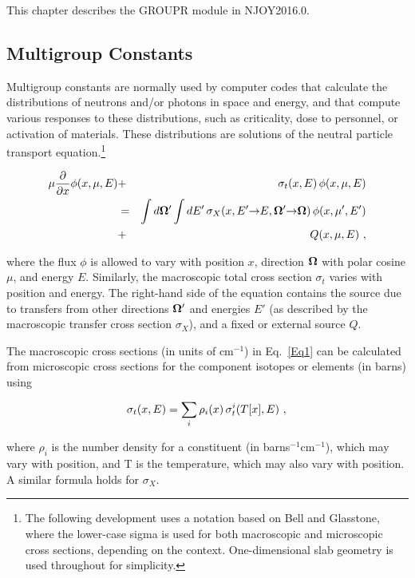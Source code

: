 This chapter describes the GROUPR module in NJOY2016.0.

\subsection{Multigroup Constants}
\label{ssGROUPR_MG}

Multigroup constants are normally used by computer codes that calculate
the distributions of neutrons and/or photons in space and energy, and that
compute various responses to these distributions, such as criticality,
dose to personnel, or activation of materials.  These distributions are
solutions of the neutral particle transport equation.\footnote
{The following development uses a notation based on Bell and
Glasstone\cite{ref5}, where the lower-case sigma is used for both
macroscopic and microscopic cross sections, depending on the context.
One-dimensional slab geometry is used throughout for simplicity. }

  \begin{eqnarray}
    \mu{{\partial}\over{\partial x}}\phi(x,\mu,E)
    &+&\sigma_t(x,E)\,\phi(x,\mu,E)\nonumber\\
    &=&\int d{\bf\Omega}'\int dE'\,\sigma_X(x,E'{\rightarrow}E,
    {\bf\Omega}'{\rightarrow}{\bf\Omega})
    \,\phi(x,\mu',E')\nonumber\\
    &+&Q(x,\mu,E) \,\,,
  \label{Eq1}
  \end{eqnarray}

\noindent
where the flux $\phi$ is allowed to vary with position $x$, direction
${\bf\Omega}$ with polar cosine $\mu$, and energy $E$.  Similarly, the
macroscopic total cross section $\sigma_t$ varies with position and
energy.  The right-hand side of the equation contains the source due to
transfers from other directions ${\bf\Omega}'$ and energies $E'$ (as
described by the macroscopic transfer cross section $\sigma_X$), and
a fixed or external source $Q$.

The macroscopic cross sections (in units of cm$^{-1}$) in Eq.~\ref{Eq1}
can be calculated from microscopic cross sections for the component
isotopes or elements (in barns) using

  \begin{equation}
    \sigma_t(x,E)=\sum_i\rho_i(x)\,\sigma_t^i(T[x],E) \,\,,\\
  \end{equation}

\noindent
where $\rho_i$ is the number density for a constituent (in
barns$^{-1}$cm$^{-1}$), which may vary with position, and T is the
temperature, which may also vary with position.  A similar formula
holds for $\sigma_X$.

